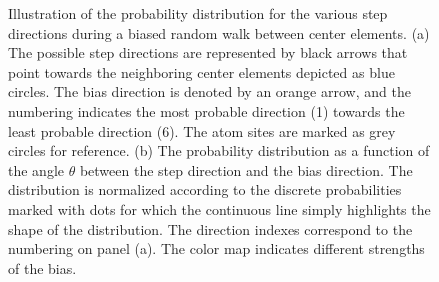 \begin{figure}[!htb]
     \caption{Illustration of the probability distribution for the various step directions during a biased random walk between center elements. (a) The possible step directions are represented by black arrows that point towards the neighboring center elements depicted as blue circles. The bias direction is denoted by an orange arrow, and the numbering indicates the most probable direction (1) towards the least probable direction (6). The atom sites are marked as grey circles for reference. (b) The probability distribution as a function of the angle $\theta$ between the step direction and the bias direction. The distribution is normalized according to the discrete probabilities marked with dots for which the continuous line simply highlights the shape of the distribution. The direction indexes correspond to the numbering on panel (a). The color map indicates different strengths of the bias. }
     \label{fig:bias_prob}
\end{figure}


